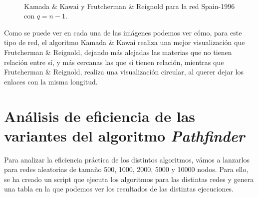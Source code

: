 \documentclass[paper=a4, fontsize=11pt]{article} %
\numberwithin{equation}{section} %
\numberwithin{figure}{section} %
\numberwithin{table}{section} %
\begin{document}
\begin{figure}[H]
    \centering
    \mbox {
      \qquad
    }
    \caption{Kamada \& Kawai y Frutcherman \& Reignold para la red Spain-1996 con $q=n-1$.}
    \label{spqN-1}
\end{figure}

Como se puede ver en cada una de las imágenes podemos ver cómo, para este tipo de red, el algoritmo Kamada \& Kawai realiza una mejor visualización que Frutcherman \& Reignold, dejando más alejadas las materias que no tienen relación entre sí, y más cercanas las que sí tienen relación, mientras que Frutcherman \& Reignold, realiza una visualización circular, al querer dejar los enlaces con la misma longitud.

\section{Análisis de eficiencia de las variantes del algoritmo \textit{Pathfinder}}

Para analizar la eficiencia práctica de los distintos algoritmos, vámos a lanzarlos para redes aleatorias de tamaño 500, 1000, 2000, 5000 y 10000 nodos. Para ello, se ha creado un script que ejecuta los algoritmos para las distintas redes y genera una tabla en la que podemos ver los resultados de las distintas ejecuciones.
\end{document}
